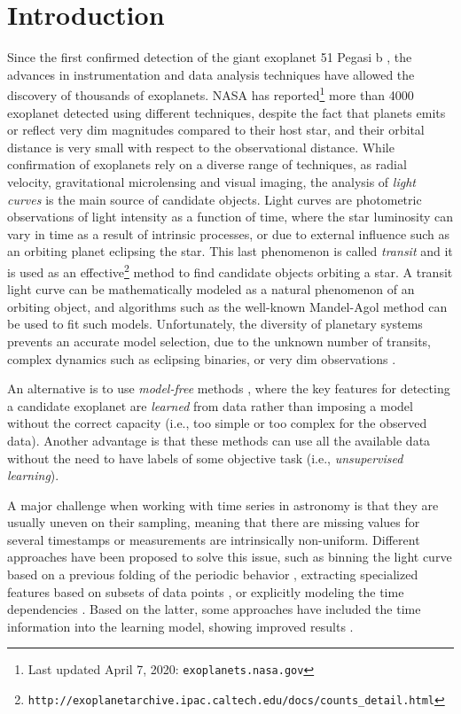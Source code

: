 \section{Introduction}

Since the first confirmed detection of the giant exoplanet 51 Pegasi b \citep{mayor1995jupiter}, the advances in instrumentation and data analysis techniques have allowed the discovery of thousands of exoplanets. NASA has reported\footnote{Last updated April 7, 2020: \texttt{exoplanets.nasa.gov}} more than 4000 exoplanet detected using different techniques, despite the fact that planets emits or reflect very dim magnitudes compared to their host star, and their orbital distance is very small with respect to the observational distance. While confirmation of exoplanets rely on a diverse range of techniques, as radial velocity, gravitational microlensing and visual imaging, the analysis of \textit{light curves} is the main source of candidate objects. Light curves are photometric observations of light intensity as a function of time, where the star luminosity can vary in time as a result of intrinsic processes, or due to external influence such as an orbiting planet eclipsing the star. This last phenomenon is called \textit{transit} and it is used as an effective\footnote{\texttt{http://exoplanetarchive.ipac.caltech.edu/docs/counts\_detail.html}} method to find candidate objects orbiting a star. A transit light curve can be mathematically modeled as a natural phenomenon of an orbiting object, and algorithms such as the well-known Mandel-Agol method \citep{mandel2002analytic} can be used to fit such models. Unfortunately, the diversity of planetary systems prevents an accurate model selection, due to the unknown number of transits, complex dynamics such as eclipsing binaries, or very dim observations \citep{moutou2005compar}. 

An alternative is to use \emph{model-free} methods \citep{mackenzie2016clustering,naul2018recurrent}, where the key features for detecting a candidate exoplanet are \emph{learned} from data rather than imposing a model without the correct capacity (i.e., too simple or too complex for the observed data).  
Another advantage is that these methods can use all the available data without the need to have labels of some objective task (i.e., \textit{unsupervised learning}). 

A major challenge when working with time series in astronomy is that they are usually uneven on their sampling, meaning that there are missing values for several timestamps or measurements are intrinsically non-uniform.
Different approaches have been proposed to solve this issue, such as binning the light curve based on a previous folding of the periodic behavior \citep{shallue2018identifying}, extracting specialized features based on subsets of data points \citep{richards2011machine}, or explicitly modeling the time dependencies \citep{lomb1976least}. 
Based on the latter, some approaches have included the time information into the learning model, showing improved results \citep{naul2018recurrent,tsang2019deep,aguirre2019deep}.


